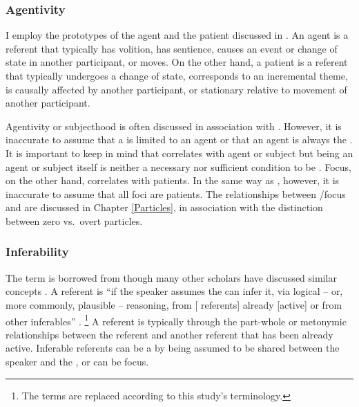 \subsubsection{Agentivity}

I employ the prototypes of the agent and the patient
discussed in .
An agent is a referent
that typically has volition,
has sentience,
causes an event or change of state in another participant, or
moves.
On the other hand,
a patient is a referent
that typically undergoes a change of state,
corresponds to an incremental theme,
is causally affected by another participant, or
stationary relative to movement of another participant.

Agentivity or subjecthood is often discussed in association with  \cite[][inter alia]{li76}.
However, it is inaccurate to assume that a  is limited to an agent
or that an agent is always the .
It is important to keep in mind that
 correlates with agent or subject
but being an agent or subject itself is neither a necessary nor sufficient condition to be .
Focus, on the other hand, correlates with patients.
In the same way as , however,
it is inaccurate to assume that all foci are patients.
The relationships between /focus and  are discussed in Chapter \ref{Particles},
in association with the distinction between zero vs.\ overt particles.


\subsubsection{Inferability}


The term  is borrowed from 
though many other scholars have discussed similar concepts \cite[e.g.,][]{havilandclark74,chafe94}.
A  referent is 
``if the speaker assumes the  can infer it, via logical --  or, more commonly, plausible -- reasoning, from [ referents] already [active] or from other inferables'' \cite[][p.\ 236]{prince81}.%
	\footnote{
	The terms are replaced according to this study's terminology.
	}
A referent is  typically through
the part-whole or metonymic relationships between the referent and another referent that has been already active.
Inferable referents can be a 
by being assumed to be shared between the speaker and the ,
or can be focus.

